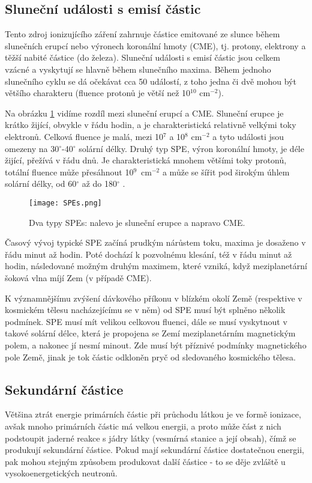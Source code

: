 \subsection{Sluneční události s emisí částic}
Tento zdroj ionizujícího záření zahrnuje částice emitované ze slunce během slunečních erupcí nebo výronech koronální hmoty (CME), tj. protony, elektrony a těžší nabité částice (do železa). Sluneční události s emisí částic jsou celkem vzácné a vyskytují se hlavně během slunečního maxima. Během jednoho slunečního cyklu se dá očekávat cca 50 událostí, z toho jedna či dvě mohou být většího charakteru (fluence protonů je větší než 10$^{10}$ cm$^{-2}$).

Na obrázku \ref{fig:SPEs} vidíme rozdíl mezi sluneční erupcí a CME. Sluneční erupce je krátko žijící, obvykle v řádu hodin, a je charakteristická relativně velkými toky elektronů. Celková fluence je malá, mezi 10$^7$ a 10$^8$ cm$^{-2}$ a tyto události jsou omezeny na 30$^\circ$-40$^\circ$ solární délky. Druhý typ SPE, výron koronální hmoty, je déle žijící, přežívá v řádu dnů. Je charakteristická mnohem většími toky protonů, totální fluence může přesáhnout 10$^9$~cm$^{-2}$ a může se šířit pod širokým úhlem solární délky, od 60$^\circ$ až do 180$^\circ$ \cite{benton}.

\begin{figure}[H]
  \centering
  \texttt{[image: SPEs.png]}
  \caption{Dva typy SPEs: nalevo je sluneční erupce a napravo CME. \cite{benton}}
  \label{fig:SPEs}
\end{figure}

Časový vývoj typické SPE začíná prudkým nárůstem toku, maxima je dosaženo v řádu minut až hodin. Poté dochází k pozvolnému klesání, též v řádu minut až hodin, následované možným druhým maximem, které vzniká, když meziplanetární šoková vlna míjí Zem (v případě CME).

K významnějšímu zvýšení dávkového příkonu v blízkém okolí Země (respektive v kosmickém tělesu nacházejícímu se v něm) od SPE musí být splněno několik podmínek. SPE musí mít velikou celkovou fluenci, dále se musí vyskytnout v takové solární délce, která je propojena se Zemí meziplanetárním magnetickým polem, a nakonec jí nesmí minout. Zde musí být příznivé podmínky magnetického pole Země, jinak je tok částic odkloněn pryč od sledovaného kosmického tělesa. 
\subsection{Sekundární částice}
Většina ztrát energie primárních částic při průchodu látkou je ve formě ionizace, avšak mnoho primárních částic má velkou energii, a proto může část z nich podstoupit jaderné reakce s jádry látky (vesmírná stanice a její obsah), čímž se produkují sekundární částice. Pokud mají sekundární částice dostatečnou energii, pak mohou stejným způsobem produkovat další částice - to se děje zvláště u vysokoenergetických neutronů.

